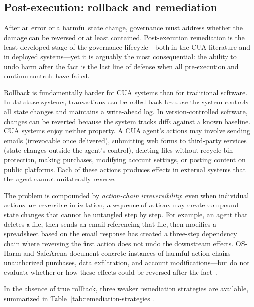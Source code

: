 \subsection{Post-execution: rollback and remediation}

After an error or a harmful state change, governance must address whether the damage can be reversed or at least contained. Post-execution remediation is the least developed stage of the governance lifecycle---both in the CUA literature and in deployed systems---yet it is arguably the most consequential: the ability to undo harm after the fact is the last line of defense when all pre-execution and runtime controls have failed.

Rollback is fundamentally harder for CUA systems than for traditional software. In database systems, transactions can be rolled back because the system controls all state changes and maintains a write-ahead log. In version-controlled software, changes can be reverted because the system tracks diffs against a known baseline. CUA systems enjoy neither property. A CUA agent's actions may involve sending emails (irrevocable once delivered), submitting web forms to third-party services (state changes outside the agent's control), deleting files without recycle-bin protection, making purchases, modifying account settings, or posting content on public platforms. Each of these actions produces effects in external systems that the agent cannot unilaterally reverse.

The problem is compounded by \emph{action-chain irreversibility}: even when individual actions are reversible in isolation, a sequence of actions may create compound state changes that cannot be untangled step by step. For example, an agent that deletes a file, then sends an email referencing that file, then modifies a spreadsheet based on the email response has created a three-step dependency chain where reversing the first action does not undo the downstream effects. OS-Harm and SafeArena document concrete instances of harmful action chains---unauthorized purchases, data exfiltration, and account modifications---but do not evaluate whether or how these effects could be reversed after the fact~\cite{osharm2025,safearena2025}.

In the absence of true rollback, three weaker remediation strategies are available, summarized in Table~\ref{tab:remediation-strategies}.

